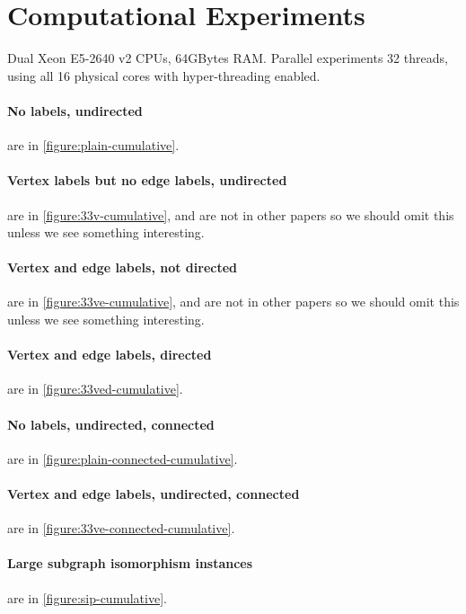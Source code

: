 \documentclass[letterpaper]{article}
\begin{document}
\section{Computational Experiments}

Dual Xeon E5-2640 v2 CPUs, 64GBytes RAM. Parallel experiments 32 threads, using
all 16 physical cores with hyper-threading enabled.

\paragraph{No labels, undirected} are in \cref{figure:plain-cumulative}.

\paragraph{Vertex labels but no edge labels, undirected} are in \cref{figure:33v-cumulative}, and are not in other papers so we should omit this unless we see something interesting.

\paragraph{Vertex and edge labels, not directed} are in \cref{figure:33ve-cumulative}, and are not in other papers so we should omit this unless we see something interesting.

\paragraph{Vertex and edge labels, directed} are in \cref{figure:33ved-cumulative}.

\paragraph{No labels, undirected, connected} are in \cref{figure:plain-connected-cumulative}.

\paragraph{Vertex and edge labels, undirected, connected} are in \cref{figure:33ve-connected-cumulative}.

\paragraph{Large subgraph isomorphism instances} are in \cref{figure:sip-cumulative}.
\end{document}
